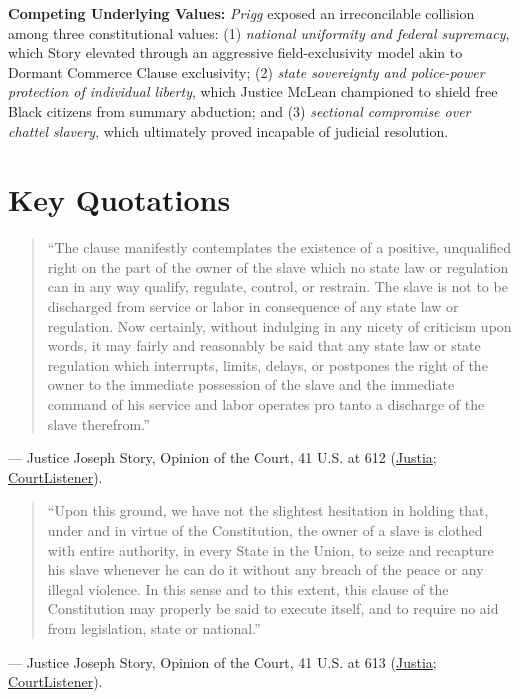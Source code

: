 \documentclass[12pt]{article}
\begin{document}
\textbf{Competing Underlying Values:} \textit{Prigg} exposed an irreconcilable collision among three constitutional values: (1) \textit{national uniformity and federal supremacy}, which Story elevated through an aggressive field-exclusivity model akin to Dormant Commerce Clause exclusivity; (2) \textit{state sovereignty and police-power protection of individual liberty}, which Justice McLean championed to shield free Black citizens from summary abduction; and (3) \textit{sectional compromise over chattel slavery}, which ultimately proved incapable of judicial resolution.

\section{Key Quotations}

\begin{quote}
``The clause manifestly contemplates the existence of a positive, unqualified right on the part of the owner of the slave which no state law or regulation can in any way qualify, regulate, control, or restrain. The slave is not to be discharged from service or labor in consequence of any state law or regulation. Now certainly, without indulging in any nicety of criticism upon words, it may fairly and reasonably be said that any state law or state regulation which interrupts, limits, delays, or postpones the right of the owner to the immediate possession of the slave and the immediate command of his service and labor operates pro tanto a discharge of the slave therefrom.''
\end{quote}
\noindent --- Justice Joseph Story, Opinion of the Court, 41 U.S. at 612 (\href{https://supreme.justia.com/cases/federal/us/41/539/}{Justia}; \href{https://www.courtlistener.com/opinion/86231/prigg-v-pennsylvania/}{CourtListener}).

\begin{quote}
``Upon this ground, we have not the slightest hesitation in holding that, under and in virtue of the Constitution, the owner of a slave is clothed with entire authority, in every State in the Union, to seize and recapture his slave whenever he can do it without any breach of the peace or any illegal violence. In this sense and to this extent, this clause of the Constitution may properly be said to execute itself, and to require no aid from legislation, state or national.''
\end{quote}
\noindent --- Justice Joseph Story, Opinion of the Court, 41 U.S. at 613 (\href{https://supreme.justia.com/cases/federal/us/41/539/}{Justia}; \href{https://www.courtlistener.com/opinion/86231/prigg-v-pennsylvania/}{CourtListener}).
\end{document}
